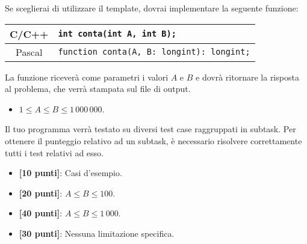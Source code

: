 Se sceglierai di utilizzare il template, dovrai implementare la seguente funzione:
\begin{center}\begin{tabularx}{\textwidth}{|c|X|}
\hline
C/C++  & \verb|int conta(int A, int B);|\\
\hline
Pascal & \verb|function conta(A, B: longint): longint;|\\
\hline
\end{tabularx}\end{center}
La funzione riceverà come parametri i valori $A$ e $B$ e dovrà ritornare la risposta al problema, che verrà stampata sul file di output.

\Constraints
\begin{itemize}[nolistsep, itemsep=2mm]
\item $1 \le A \le B \le 1\,000\,000 $.
\end{itemize}

\pagebreak
\Scoring
Il tuo programma verrà testato su diversi test case raggruppati in subtask.
Per ottenere il punteggio relativo ad un subtask, è necessario risolvere
correttamente tutti i test relativi ad esso.

\begin{itemize}[nolistsep,itemsep=2mm]
  \item \textbf{ [10 punti]}: Casi d'esempio.
  \item \textbf{ [20 punti]}: $A \le B \le 100$.
  \item \textbf{ [40 punti]}: $A \le B \le 1\,000$.
  \item \textbf{ [30 punti]}: Nessuna limitazione specifica.
\end{itemize}

\Examples
\begin{example}
\end{example}
\begin{example}
\end{example}
